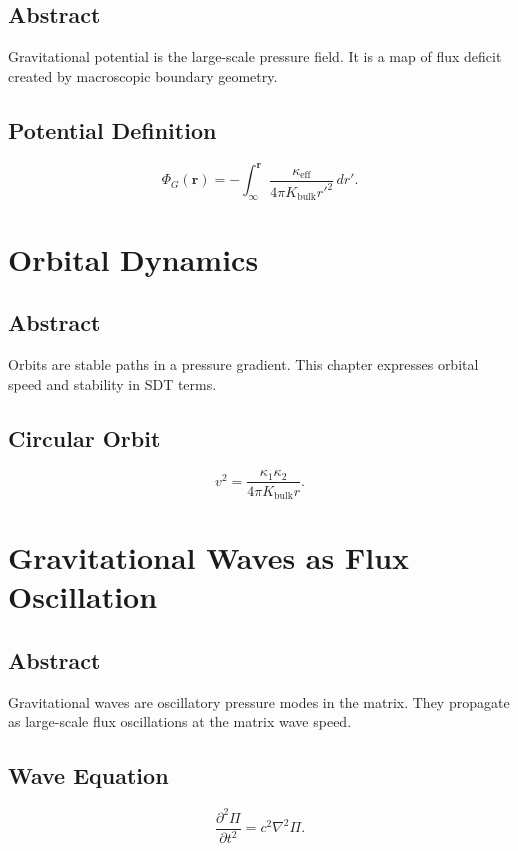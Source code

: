 \documentclass[12pt]{book}
\begin{document}
\section*{Abstract}
Gravitational potential is the large-scale pressure field. It is a map of flux deficit created by
macroscopic boundary geometry.

\section{Potential Definition}
\begin{equation}
\Phi_G(\mathbf{r}) = -\int_{\infty}^{\mathbf{r}} \frac{\kappa_{\text{eff}}}{4\pi K_{\text{bulk}} r'^2}\, dr'.
\end{equation}

\chapter{Orbital Dynamics}

\section*{Abstract}
Orbits are stable paths in a pressure gradient. This chapter expresses orbital speed and stability in
SDT terms.

\section{Circular Orbit}
\begin{equation}
v^2 = \frac{\kappa_1 \kappa_2}{4\pi K_{\text{bulk}} r}.
\end{equation}

\chapter{Gravitational Waves as Flux Oscillation}

\section*{Abstract}
Gravitational waves are oscillatory pressure modes in the matrix. They propagate as large-scale flux
oscillations at the matrix wave speed.

\section{Wave Equation}
\begin{equation}
\frac{\partial^2 \Pi}{\partial t^2} = c^2 \nabla^2 \Pi.
\end{equation}
\end{document}
